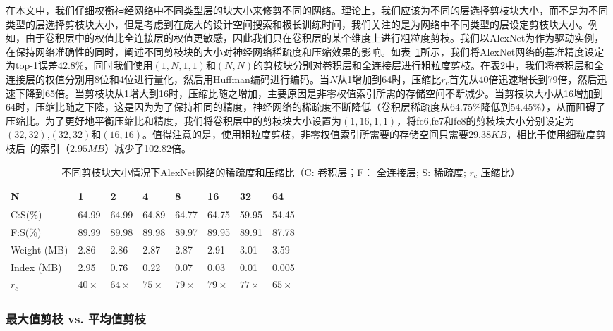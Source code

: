 在本文中，我们仔细权衡神经网络中不同类型层的块大小来修剪不同的网络。理论上，我们应该为不同的层选择剪枝块大小，而不是为不同类型的层选择剪枝块大小，但是考虑到在庞大的设计空间搜索和极长训练时间，我们关注的是为网络中不同类型的层设定剪枝块大小。例如，由于卷积层中的权值比全连接层的权值更敏感，因此我们只在卷积层的某个维度上进行粗粒度剪枝。我们以AlexNet为作为驱动实例，在保持网络准确性的同时，阐述不同剪枝块的大小对神经网络稀疏度和压缩效果的影响。如表~\ref{tab:blocksize}所示，我们将AlexNet网络的基准精度设定为top-1误差$42.8\%$，同时我们使用$(1,N,1,1)$和$(N,N)$的剪枝块分别对卷积层和全连接层进行粗粒度剪枝。在表2中，我们将卷积层和全连接层的权值分别用8位和4位进行量化，然后用Huffman编码进行编码。当$N$从1增加到64时，压缩比$r_c$首先从40倍迅速增长到79倍，然后迅速下降到65倍。当剪枝块从1增大到16时，压缩比随之增加，主要原因是非零权值索引所需的存储空间不断减少。当剪枝块大小从16增加到64时，压缩比随之下降，这是因为为了保持相同的精度，神经网络的稀疏度不断降低（卷积层稀疏度从$64.75\%$降低到$54.45\%$），从而阻碍了压缩比。为了更好地平衡压缩比和精度，我们将卷积层中的剪枝块大小设置为$(1,16,1,1)$，将fc6,fc7和fc8的剪枝块大小分别设定为$(32,32)$,$(32,32)$和$(16,16)$。值得注意的是，使用粗粒度剪枝，非零权值索引所需要的存储空间只需要$29.38KB$，相比于使用细粒度剪枝后~\cite{han2015deep}的索引（$2.95MB$）减少了102.82倍。

\begin{table}[b]
\centering
\caption{ 不同剪枝块大小情况下AlexNet网络的稀疏度和压缩比（C: 卷积层；F： 全连接层; S: 稀疏度; $r_c$ 压缩比）}
\label{tab:blocksize}
\begin{tabular}{lll@{~}llll@{~}llll@{~}llll@{~~}llll@{~~}llll@{~~}llll@{~~}lllllllll}
\toprule
N  				& 1 	&  2		& 4			& 8			& 16		& 32 		&64		\\
\midrule
C:S(\%)			& 64.99 &64.99		&64.89		&64.77		&64.75		&59.95		&54.45 	\\
F:S(\%) 		& 89.99	&89.98		&89.98		&89.97		&89.95		&89.91		&87.78	\\
Weight (MB)     & 2.86 	&2.86		&2.87		&2.87		&2.91		&3.01		&3.59	\\
Index (MB)      & 2.95	&0.76		&0.22		&0.07		&0.03		&0.01		&0.005	\\
$r_c$ 			& $40\times$ 	&$64\times$		&$75\times$		&$79\times$		&$79\times$		&$77\times$		&$65\times$	\\
\bottomrule
\end{tabular}
\end{table}

\subsubsection{最大值剪枝 vs. 平均值剪枝}


